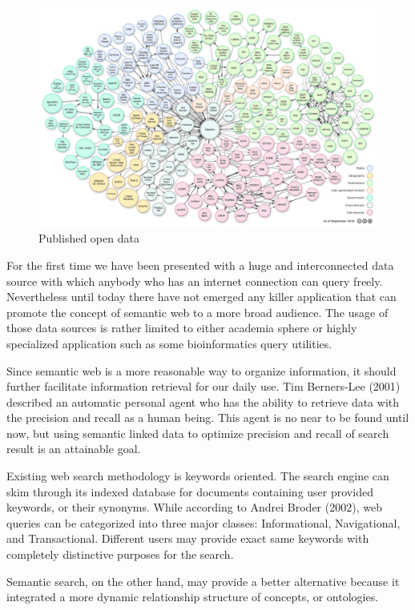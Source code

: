 \documentclass[12pt]{cls}
\begin{document}
\begin{figure}[H]
\centering
\includegraphics[width=\textwidth]{figures/opendata.jpeg}
\caption{Published open data}
\label{open data chart}
\end{figure}

For the first time we have been presented with a huge and interconnected data source with which anybody who has an internet connection can query freely. Nevertheless until today there have not emerged any killer application that can promote the concept of semantic web to a more broad audience. The usage of those data sources is rather limited to either academia sphere or highly specialized application such as some bioinformatics query utilities.

Since semantic web is a more reasonable way to organize information, it should further facilitate information retrieval for our daily use. Tim Berners-Lee (2001) described an automatic personal agent who has the ability to retrieve data with the precision and recall as a human being. This agent is no near to be found until now, but using semantic linked data to optimize precision and recall of search result is an attainable goal.

Existing web search methodology is keywords oriented. The search engine can skim through its indexed database for documents containing user provided keywords, or their synonyms. While according to Andrei Broder (2002), web queries can be categorized into three major classes: Informational, Navigational, and Transactional. Different users may provide exact same keywords with completely distinctive purposes for the search.

Semantic search, on the other hand, may provide a better alternative because it integrated a more dynamic relationship structure of concepts, or ontologies.
\end{document}
